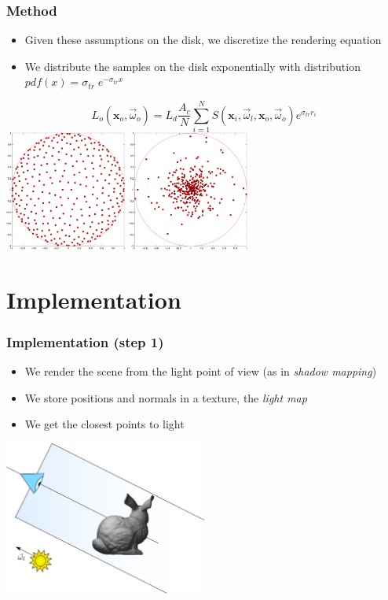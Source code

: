 \documentclass{beamer}
\newcommand{\vomega}{\vec{\omega}}
\newcommand{\x}{\mathbf{x}}
\begin{document}
\begin{frame}
    \frametitle{Method}
			\begin{itemize}
			\item Given these assumptions on the disk, we discretize the rendering equation
			\item We distribute the samples on the disk exponentially with distribution $pdf(x) = \sigma_{tr} \;e^{-\sigma_{tr}x}$
			\end{itemize}
				$$
				L_o(\x_o,\vomega_o) = L_d \frac{A_c}{N} \sum_{i = 1}^N S(\x_i, \vomega_l, \x_o, \vomega_o)  e^{\sigma_{tr} r_i}
				$$
				\vspace{-0.6cm}
				\centering
				\includegraphics[width=0.3\textwidth]{halton.pdf} \hspace{1cm}	\includegraphics[width=0.3\textwidth]{halton_exp.pdf}

\end{frame}

\section{Implementation}
\begin{frame}
    \frametitle{Implementation (step 1)}
			\begin{itemize}
			\item We render the scene from the light point of view (as in \emph{shadow mapping})
			\item We store positions and normals in a texture, the \emph{light map}
			\item We get the closest points to light
			\end{itemize}
			\centering
			\includegraphics[width=0.5\textwidth]{step1.jpg} 
\end{frame}
\end{document}
